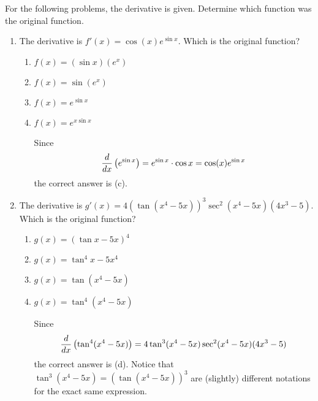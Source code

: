 \documentclass[nooutcomes]{ximera}
\begin{document}
\begin{problem}
For the following problems, the derivative is given.  Determine which function was the original function.
	\begin{enumerate}[label=\roman*.]
	
		\item  The derivative is $f'(x) = \cos (x) e^{\sin x}$.  Which is the original function?
		
			\begin{enumerate}
			
			\item  $f(x) = (\sin x)(e^x)$
			\item  $f(x) = \sin (e^x)$
			\item  $f(x) = e^{\sin x}$
			\item  $f(x) = e^{x \sin x}$
			
				\begin{freeResponse}
				Since
				$$ \frac{d}{dx} \left( e^{\sin x} \right) = e^{\sin x} \cdot \cos x = \cos(x) e^{\sin x} $$
				the correct answer is (c).  
				\end{freeResponse}
				
			\end{enumerate}
			
			
			
		\item  The derivative is $g'(x) = 4 \left( \tan (x^4 - 5x) \right)^3 \sec^2(x^4-5x)(4x^3-5)$.  Which is the original function?
		
			\begin{enumerate}
			
			\item  $g(x) = \left( \tan x - 5x \right)^4$
			\item  $g(x) = \tan^4x - 5x^4$
			\item  $g(x) = \tan(x^4 - 5x)$
			\item  $g(x) = \tan^4(x^4-5x)$
			
				\begin{freeResponse}
				Since 
				$$\frac{d}{dx} \left( \tan^4(x^4-5x) \right) = 4 \tan^3(x^4-5x) \sec^2(x^4-5x) (4x^3-5)$$ 
				the correct answer is (d).  Notice that $\tan^3(x^4-5x) = \left( \tan(x^4-5x) \right)^3$ are (slightly) different notations for the exact same expression.
				\end{freeResponse}
				
			\end{enumerate}
			
	\end{enumerate}
			
			
			
		
\end{problem}
	
\end{document}
